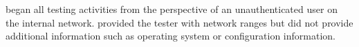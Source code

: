 \qquad \brandName began all testing activities from the perspective of an unauthenticated user on the internal
network. \enterpriseName provided the tester with network ranges but did not provide additional information such as
operating system or configuration information. 